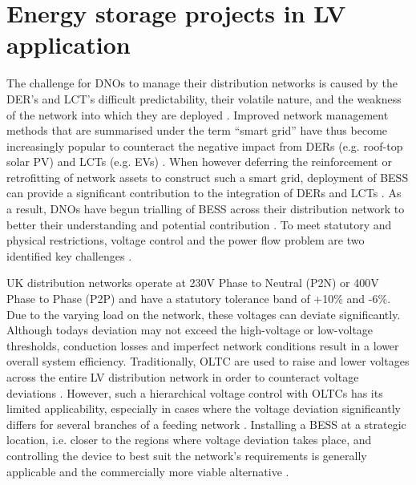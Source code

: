 \section{Energy storage projects in LV application}
\label{ch-literature:sec:energy-storage}

The challenge for DNOs to manage their distribution networks is caused by the DER's and LCT's difficult predictability, their volatile nature, and the weakness of the network into which they are deployed \cite{Woyte2006, Mohd2008a, Koureoumpezis2010, Bravo2015}.
Improved network management methods that are summarised under the term ``smart grid'' have thus become increasingly popular to counteract the negative impact from DERs (e.g. roof-top solar PV) and LCTs (e.g. EVs) \cite{Panteli2015}.
When however deferring the reinforcement or retrofitting of network assets to construct such a smart grid, deployment of BESS can provide a significant contribution to the integration of DERs and LCTs \cite{Grillo2012, Rowe2014a, Li2016, Hosseina2016a}.
As a result, DNOs have begun trialling of BESS across their distribution network to better their understanding and potential contribution \cite{NTVV2016, Lyons2015a, Ferreira2013a}.
To meet statutory and physical restrictions, voltage control and the power flow problem are two identified key challenges \cite{Shi2015}.


UK distribution networks operate at 230V Phase to Neutral (P2N) or 400V Phase to Phase (P2P) and have a statutory tolerance band of +10\% and -6\%.
Due to the varying load on the network, these voltages can deviate significantly.
Although todays deviation may not exceed the high-voltage or low-voltage thresholds, conduction losses and imperfect network conditions result in a lower overall system efficiency.
Traditionally, OLTC are used to raise and lower voltages across the entire LV distribution network in order to counteract voltage deviations \cite{Sun2009}.
However, such a hierarchical voltage control with OLTCs has its limited applicability, especially in cases where the voltage deviation significantly differs for several branches of a feeding network \cite{Zangs2016}.
Installing a BESS at a strategic location, i.e. closer to the regions where voltage deviation takes place, and controlling the device to best suit the network's requirements is generally applicable and the commercially more viable alternative \cite{Liserre2010}.

